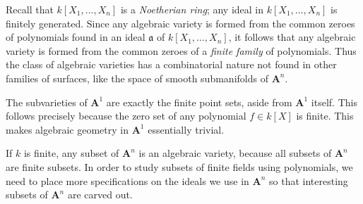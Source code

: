Recall that $k[X_1,\dots,X_n]$ is a \emph{Noetherian ring}; any ideal in $k[X_1,\dots,X_n]$ is finitely generated. Since any algebraic variety is formed from the common zeroes of polynomials found in an ideal $\mathfrak{a}$ of $k[X_1,\dots,X_n]$, it follows that any algebraic variety is formed from the common zeroes of a \emph{finite family} of polynomials. Thus the class of algebraic varieties has a combinatorial nature not found in other families of surfaces, like the space of smooth submanifolds of $\mathbf{A}^n$.

\begin{example}
    The subvarieties of $\mathbf{A}^1$ are exactly the finite point sets, aside from $\mathbf{A}^1$ itself. This follows precisely because the zero set of any polynomial $f \in k[X]$ is finite. This makes algebraic geometry in $\mathbf{A}^1$ essentially trivial.
\end{example}

\begin{example}
    If $k$ is finite, any subset of $\mathbf{A}^n$ is an algebraic variety, because all subsets of $\mathbf{A}^n$ are finite subsets. In order to study subsets of finite fields using polynomials, we need to place more specifications on the ideals we use in $\mathbf{A}^n$ so that interesting subsets of $\mathbf{A}^n$ are carved out.
\end{example}

